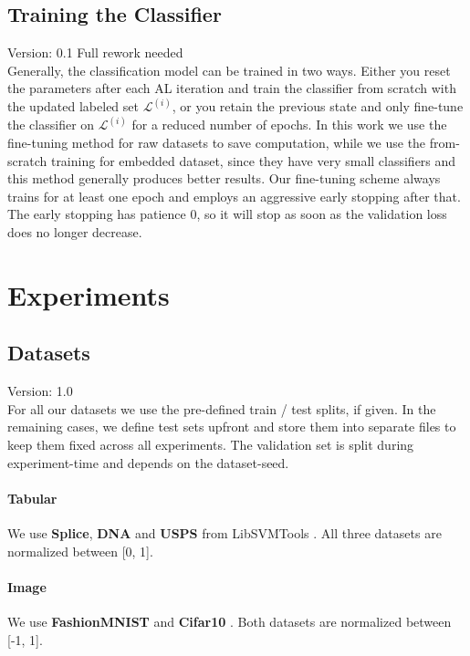 \documentclass[]{article}
\begin{document}
\subsection{Training the Classifier}\label{sec:training_the_classifier}
{\color{red} Version: 0.1 Full rework needed}\\
Generally, the classification model can be trained in two ways. Either you reset the parameters after each AL iteration and train the classifier from scratch with the updated labeled set $\mathcal{L}^{(i)}$, or you retain the previous state and only fine-tune the classifier on $\mathcal{L}^{(i)}$ for a reduced number of epochs.
In this work we use the fine-tuning method for raw datasets to save computation, while we use the from-scratch training for embedded dataset, since they have very small classifiers and this method generally produces better results.
Our fine-tuning scheme always trains for at least one epoch and employs an aggressive early stopping after that.
The early stopping has patience 0, so it will stop as soon as the validation loss does no longer decrease.

\section{Experiments}

\subsection{Datasets}\label{sec:datasets}
{\color{red} Version: 1.0}\\
For all our datasets we use the pre-defined train / test splits, if given. 
In the remaining cases, we define test sets upfront and store them into separate files to keep them fixed across all experiments.
The validation set is split during experiment-time and depends on the dataset-seed.

\paragraph{Tabular}
We use \textbf{Splice}, \textbf{DNA} and \textbf{USPS} from LibSVMTools \cite{libsvmtools}.
All three datasets are normalized between [0, 1].

\paragraph{Image}
We use \textbf{FashionMNIST} \cite{xiao2017fashion} and \textbf{Cifar10} \cite{krizhevsky2009learning}.
Both datasets are normalized between [-1, 1].
\end{document}
